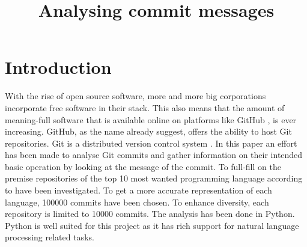 \documentclass{article}
\title{Analysing commit messages}
\begin{document}
  \maketitle

  \section{Introduction}
  With the rise of open source software, more and more big corporations
  incorporate free software in their stack. This also means that the amount of
  meaning-full software that is available online on platforms like GitHub
  \cite{github}, is ever increasing. GitHub, as the name already suggest,
  offers the ability to host Git repositories. Git is a distributed version
  control system \cite{git}. In this paper an effort has been made to analyse
  Git commits and gather information on their intended basic operation by
  looking at the message of the commit. To full-fill on the premise
  repositories of the top 10 most wanted programming language according to
  \cite{so-survey} have been investigated. To get a more accurate
  representation of each language, 100000 commits have been chosen. To enhance
  diversity, each repository is limited to 10000 commits. The analysis has been
  done in Python. Python is well suited for this project as it has rich support
  for natural language processing related tasks.
\end{document}
